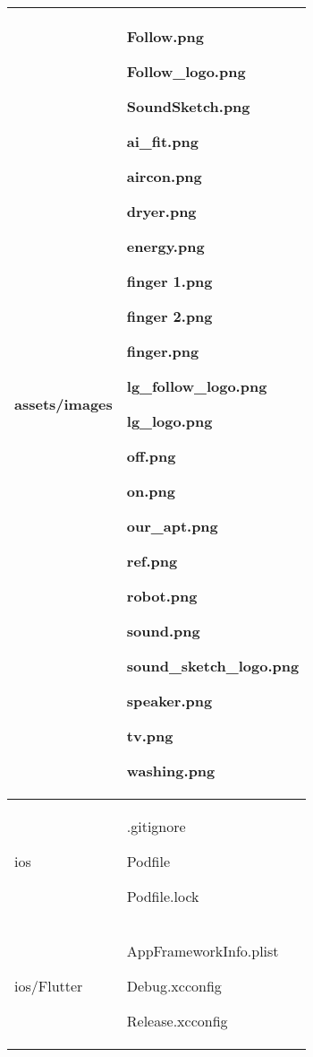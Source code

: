 \documentclass[conference]{IEEEtran}
\begin{document}
\begin{table}[h!]
\begin{tabular}{|p{4.1cm}|p{4.1cm}|}
    assets/images & Follow.png \par Follow\_logo.png \par SoundSketch.png \par ai\_fit.png \par aircon.png \par dryer.png \par energy.png \par finger 1.png \par finger 2.png \par finger.png \par lg\_follow\_logo.png \par lg\_logo.png \par off.png \par on.png \par our\_apt.png \par ref.png \par robot.png \par sound.png \par sound\_sketch\_logo.png \par speaker.png \par tv.png \par washing.png \\ \hline
    ios & .gitignore \par Podfile \par Podfile.lock \\ \hline
    ios/Flutter & AppFrameworkInfo.plist \par Debug.xcconfig \par Release.xcconfig \\ \hline
\end{tabular}
\end{table}
\end{document}
